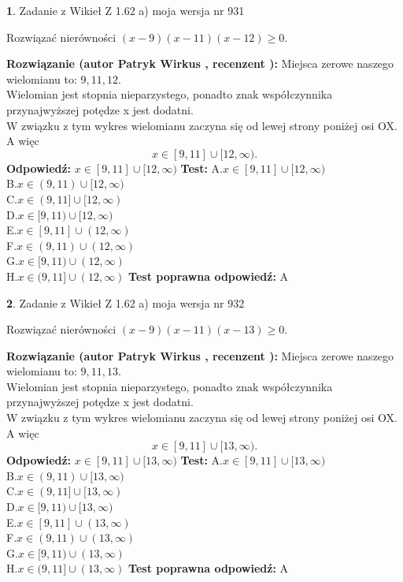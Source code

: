 \documentclass[12pt, a4paper]{article}
\theoremstyle{definition} %
\newtheorem{zad}{}
\newcommand{\zadStart}[1]{\begin{zad}#1\newline}
\newcommand{\zadStop}{\end{zad}}
\newcommand{\rozwStart}[2]{\noindent \textbf{Rozwiązanie (autor #1 , recenzent #2): }\newline}
\newcommand{\rozwStop}{\newline}
\newcommand{\odpStart}{\noindent \textbf{Odpowiedź:}\newline}
\newcommand{\odpStop}{\newline}
\newcommand{\testStart}{\noindent \textbf{Test:}\newline}
\newcommand{\testStop}{\newline}
\newcommand{\kluczStart}{\noindent \textbf{Test poprawna odpowiedź:}\newline}
\newcommand{\kluczStop}{\newline}
\begin{document}
\zadStart{Zadanie z Wikieł Z 1.62 a) moja wersja nr 931}

Rozwiązać nierówności $(x-9)(x-11)(x-12)\ge0$.
\zadStop
\rozwStart{Patryk Wirkus}{}
Miejsca zerowe naszego wielomianu to: $9, 11, 12$.\\
Wielomian jest stopnia nieparzystego, ponadto znak współczynnika przy\linebreak najwyższej potędze x jest dodatni.\\ W związku z tym wykres wielomianu zaczyna się od lewej strony poniżej osi OX. A więc $$x \in [9,11] \cup [12,\infty).$$
\rozwStop
\odpStart
$x \in [9,11] \cup [12,\infty)$
\odpStop
\testStart
A.$x \in [9,11] \cup [12,\infty)$\\
B.$x \in (9,11) \cup [12,\infty)$\\
C.$x \in (9,11] \cup [12,\infty)$\\
D.$x \in [9,11) \cup [12,\infty)$\\
E.$x \in [9,11] \cup (12,\infty)$\\
F.$x \in (9,11) \cup (12,\infty)$\\
G.$x \in [9,11) \cup (12,\infty)$\\
H.$x \in (9,11] \cup (12,\infty)$
\testStop
\kluczStart
A
\kluczStop



\zadStart{Zadanie z Wikieł Z 1.62 a) moja wersja nr 932}

Rozwiązać nierówności $(x-9)(x-11)(x-13)\ge0$.
\zadStop
\rozwStart{Patryk Wirkus}{}
Miejsca zerowe naszego wielomianu to: $9, 11, 13$.\\
Wielomian jest stopnia nieparzystego, ponadto znak współczynnika przy\linebreak najwyższej potędze x jest dodatni.\\ W związku z tym wykres wielomianu zaczyna się od lewej strony poniżej osi OX. A więc $$x \in [9,11] \cup [13,\infty).$$
\rozwStop
\odpStart
$x \in [9,11] \cup [13,\infty)$
\odpStop
\testStart
A.$x \in [9,11] \cup [13,\infty)$\\
B.$x \in (9,11) \cup [13,\infty)$\\
C.$x \in (9,11] \cup [13,\infty)$\\
D.$x \in [9,11) \cup [13,\infty)$\\
E.$x \in [9,11] \cup (13,\infty)$\\
F.$x \in (9,11) \cup (13,\infty)$\\
G.$x \in [9,11) \cup (13,\infty)$\\
H.$x \in (9,11] \cup (13,\infty)$
\testStop
\kluczStart
A
\kluczStop
\end{document}
